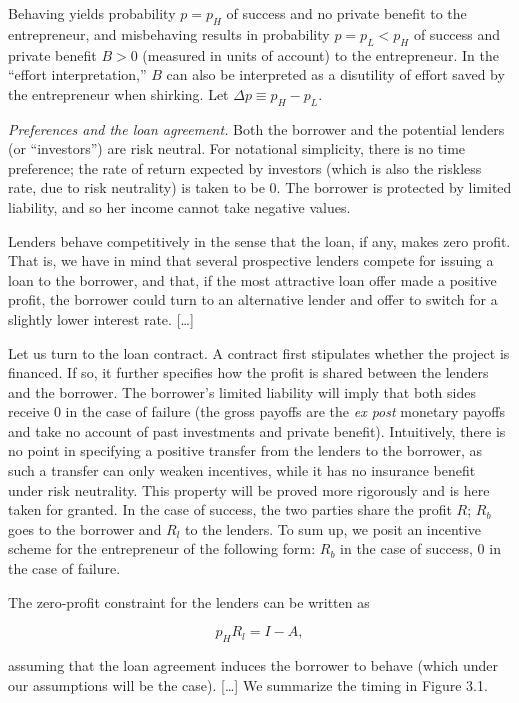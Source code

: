 \documentclass[11pt,a4paper]{article}
\begin{document}
Behaving yields probability \(p = p_H\) of success and no private benefit to the entrepreneur, and
misbehaving results in probability \(p = p_L < p_H\) of success and private benefit \(B > 0\)
(measured in units of account) to the entrepreneur. In the ``effort interpretation,'' \(B\) can also
be interpreted as a disutility of effort saved by the entrepreneur when shirking. Let
\(\Delta p \equiv p_H - p_L\).

\emph{Preferences and the loan agreement.} Both the borrower and the potential lenders (or
``investors'') are risk neutral. For notational simplicity, there is no time preference; the rate of
return expected by investors (which is also the riskless rate, due to risk neutrality) is taken to
be 0. The borrower is protected by limited liability, and so her income cannot take negative values.

Lenders behave competitively in the sense that the loan, if any, makes zero profit. That is, we have
in mind that several prospective lenders compete for issuing a loan to the borrower, and that, if
the most attractive loan offer made a positive profit, the borrower could turn to an alternative
lender and offer to switch for a slightly lower interest rate. {[}\ldots{]}

Let us turn to the loan contract. A contract first stipulates whether the project is financed. If
so, it further specifies how the profit is shared between the lenders and the borrower. The
borrower's limited liability will imply that both sides receive 0 in the case of failure (the gross
payoffs are the \emph{ex post} monetary payoffs and take no account of past investments and private
benefit). Intuitively, there is no point in specifying a positive transfer from the lenders to the
borrower, as such a transfer can only weaken incentives, while it has no insurance benefit under
risk neutrality. This property will be proved more rigorously and is here taken for granted. In the
case of success, the two parties share the profit \(R\); \(R_b\) goes to the borrower and \(R_l\) to
the lenders. To sum up, we posit an incentive scheme for the entrepreneur of the following form:
\(R_b\) in the case of success, 0 in the case of failure.

The zero-profit constraint for the lenders can be written as

\[p_H R_l = I - A,\]

assuming that the loan agreement induces the borrower to behave (which under our assumptions will be
the case). {[}\ldots{]} We summarize the timing in Figure 3.1.
\end{document}
